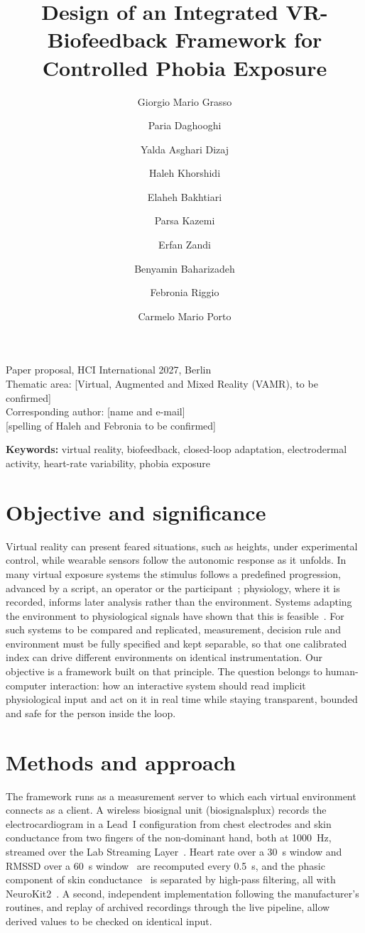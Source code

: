 \documentclass[11pt,a4paper]{article}
\title{Design of an Integrated VR-Biofeedback Framework for Controlled
Phobia Exposure}
\author[1]{Giorgio Mario Grasso}
\author[1]{Paria Daghooghi}
\author[1]{Yalda Asghari Dizaj}
\author[1]{Haleh Khorshidi}
\author[1]{Elaheh Bakhtiari}
\author[1]{Parsa Kazemi}
\author[1]{Erfan Zandi}
\author[1]{Benyamin Baharizadeh}
\author[2]{Febronia Riggio}
\author[2]{Carmelo Mario Porto}
\affil[1]{NISC Lab, Cognitive Science Department, University of Messina,
Italy}
\affil[2]{\ph{affiliation to be confirmed}}
\date{}
\newcommand{\ph}[1]{\textcolor{red!65!black}{[#1]}}
\begin{document}
\maketitle

\begin{center}
\small
Paper proposal, HCI International 2027, Berlin\\
Thematic area: \ph{Virtual, Augmented and Mixed Reality (VAMR), to be
confirmed}\\
Corresponding author: \ph{name and e-mail}\\
\ph{spelling of Haleh and Febronia to be confirmed}
\end{center}

\noindent\textbf{Keywords:} virtual reality, biofeedback, closed-loop
adaptation, electrodermal activity, heart-rate variability, phobia
exposure

\section*{Objective and significance}

Virtual reality can present feared situations, such as heights, under
experimental control, while wearable sensors follow the autonomic
response as it unfolds. In many virtual exposure systems the stimulus
follows a predefined progression, advanced by a script, an operator or
the participant~\cite{rothbaum1995,freeman2018}; physiology, where it is
recorded, informs later analysis rather than the environment. Systems
adapting the environment to physiological signals have shown that this
is
feasible~\cite{moldoveanu2023,kritikos2021,mahmoudinejad2021,wriessnegger2026}.
For such systems to be compared and replicated, measurement, decision
rule and environment must be fully specified and kept separable, so that
one calibrated index can drive different environments on identical
instrumentation. Our objective is a framework built on that principle.
The question belongs to human-computer interaction: how an interactive
system should read implicit physiological input and act on it in real
time while staying transparent, bounded and safe for the person inside
the loop.

\section*{Methods and approach}

The framework runs as a measurement server to which each virtual
environment connects as a client. A wireless biosignal unit
(biosignalsplux) records the electrocardiogram in a Lead~I configuration
from chest electrodes and skin conductance from two fingers of the
non-dominant hand, both at 1000~Hz, streamed over the Lab Streaming
Layer~\cite{kothe2025}. Heart rate over a 30~s window and RMSSD over a
60~s window~\cite{taskforce1996} are recomputed every 0.5~s, and the
phasic component of skin conductance~\cite{boucsein2012} is separated by
high-pass filtering, all with NeuroKit2~\cite{makowski2021}. A second,
independent implementation following the manufacturer's routines, and
replay of archived recordings through the live pipeline, allow derived
values to be checked on identical input.
\end{document}
